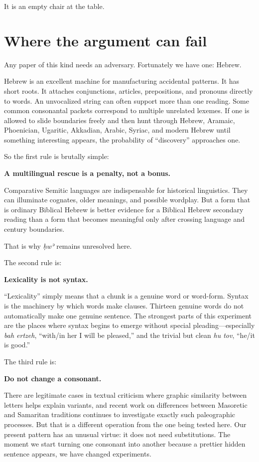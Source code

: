 It is an empty chair at the table.

\section*{Where the argument can fail}

Any paper of this kind needs an adversary. Fortunately we have one: Hebrew.

Hebrew is an excellent machine for manufacturing accidental patterns. It has short roots. It attaches conjunctions, articles, prepositions, and pronouns directly to words. An unvocalized string can often support more than one reading. Some common consonantal packets correspond to multiple unrelated lexemes. If one is allowed to slide boundaries freely and then hunt through Hebrew, Aramaic, Phoenician, Ugaritic, Akkadian, Arabic, Syriac, and modern Hebrew until something interesting appears, the probability of ``discovery'' approaches one.

So the first rule is brutally simple:

\textbf{A multilingual rescue is a penalty, not a bonus.}

Comparative Semitic languages are indispensable for historical linguistics. They can illuminate cognates, older meanings, and possible wordplay. But a form that is ordinary Biblical Hebrew is better evidence for a Biblical Hebrew secondary reading than a form that becomes meaningful only after crossing language and century boundaries.

That is why \textit{ḥwʾ} remains unresolved here.

The second rule is:

\textbf{Lexicality is not syntax.}

``Lexicality'' simply means that a chunk is a genuine word or word-form. Syntax is the machinery by which words make clauses. Thirteen genuine words do not automatically make one genuine sentence. The strongest parts of this experiment are the places where syntax begins to emerge without special pleading---especially \textit{bah ertzeh}, ``with/in her I will be pleased,'' and the trivial but clean \textit{hu tov}, ``he/it is good.''\cite{BDB}

The third rule is:

\textbf{Do not change a consonant.}

There are legitimate cases in textual criticism where graphic similarity between letters helps explain variants, and recent work on differences between Masoretic and Samaritan traditions continues to investigate exactly such paleographic processes. But that is a different operation from the one being tested here. Our present pattern has an unusual virtue: it does not need substitutions. The moment we start turning one consonant into another because a prettier hidden sentence appears, we have changed experiments.\cite{Tov2012}

